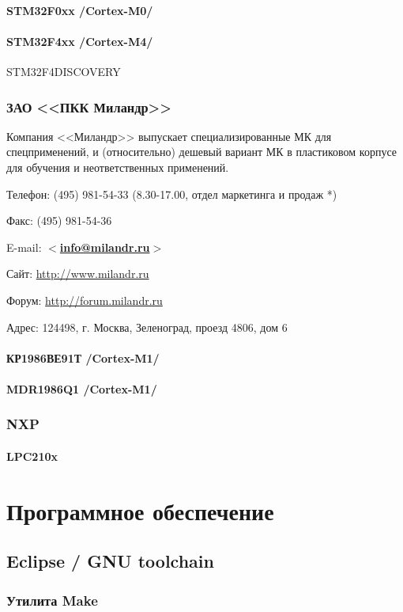 \documentclass[oneside,12pt]{book}
\newcommand{\cm}[1]{Cortex-M#1}
\newcommand{\email}[1]{$<$\href{mailto:#1}{\textbf{#1}}$>$}
\begin{document}
\subsection{STM32F0xx /\cm{0}/}

\subsection{STM32F4xx /\cm{4}/} STM32F4DISCOVERY
\section{ЗАО <<ПКК Миландр>>}

Компания <<Миландр>> выпускает специализированные МК для спецприменений,
и (относительно) дешевый вариант МК в пластиковом корпусе для обучения
и неответственных применений.

\bigskip

Телефон: (495) 981-54-33 (8.30-17.00, отдел маркетинга и продаж *)

Факс: (495) 981-54-36

E-mail: \email{info@milandr.ru}

Сайт: \url{http://www.milandr.ru}

Форум: \url{http://forum.milandr.ru}

Адрес: 124498, г. Москва, Зеленоград, проезд 4806, дом 6

\subsection{КР1986ВЕ91Т /\cm{1}/}
\subsection{MDR1986Q1 /\cm{1}/}
\section{NXP}
\subsection{LPC210x}

\part{Программное обеспечение}
\chapter{Eclipse / GNU toolchain}
\section{Утилита Make}
\end{document}
